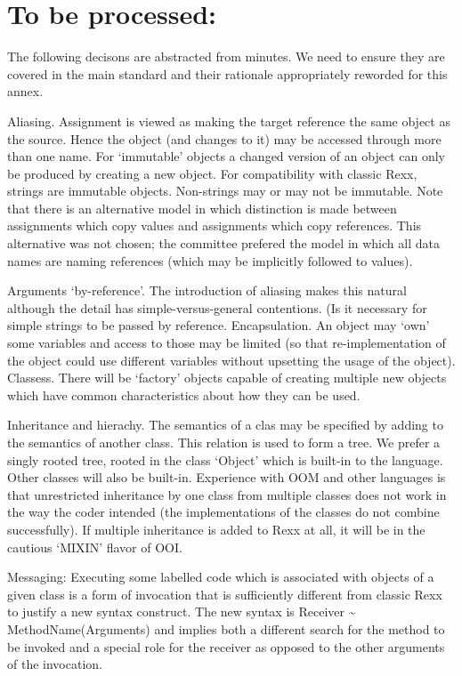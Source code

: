 \hypertarget{to-be-processed}{%
\chapter{To be processed:}\label{to-be-processed}}

The following decisons are abstracted from minutes. We need to ensure
they are covered in the main standard and their rationale appropriately
reworded for this annex.

Aliasing. Assignment is viewed as making the target reference the same
object as the source. Hence the object (and changes to it) may be
accessed through more than one name. For `immutable' objects a changed
version of an object can only be produced by creating a new object. For
compatibility with classic Rexx, strings are immutable objects.
Non-strings may or may not be immutable. Note that there is an
alternative model in which distinction is made between assignments which
copy values and assignments which copy references. This alternative was
not chosen; the committee prefered the model in which all data names are
naming references (which may be implicitly followed to values).

Arguments `by-reference'. The introduction of aliasing makes this
natural although the detail has simple-versus-general contentions. (Is
it necessary for simple strings to be passed by reference.
Encapsulation. An object may `own' some variables and access to those
may be limited (so that re-implementation of the object could use
different variables without upsetting the usage of the object).
Classess. There will be `factory' objects capable of creating multiple
new objects which have common characteristics about how they can be
used.

Inheritance and hierachy. The semantics of a clas may be specified by
adding to the semantics of another class. This relation is used to form
a tree. We prefer a singly rooted tree, rooted in the class `Object'
which is built-in to the language. Other classes will also be built-in.
Experience with OOM and other languages is that unrestricted inheritance
by one class from multiple classes does not work in the way the coder
intended (the implementations of the classes do not combine
successfully). If multiple inheritance is added to Rexx at all, it will
be in the cautious `MIXIN' flavor of OOI.

Messaging: Executing some labelled code which is associated with objects
of a given class is a form of invocation that is sufficiently different
from classic Rexx to justify a new syntax construct. The new syntax is
Receiver \textasciitilde{} MethodName(Arguments) and implies both a
different search for the method to be invoked and a special role for the
receiver as opposed to the other arguments of the invocation.

